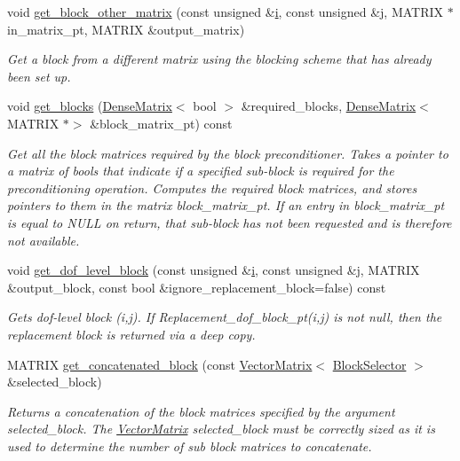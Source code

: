 \begin{DoxyCompactItemize}
void \hyperlink{classoomph_1_1BlockPreconditioner_a9dae351352d344321ea82999d7003e17}{get\+\_\+block\+\_\+other\+\_\+matrix} (const unsigned \&\hyperlink{cfortran_8h_adb50e893b86b3e55e751a42eab3cba82}{i}, const unsigned \&j, M\+A\+T\+R\+IX $\ast$in\+\_\+matrix\+\_\+pt, M\+A\+T\+R\+IX \&output\+\_\+matrix)
\begin{DoxyCompactList}\small\item\em Get a block from a different matrix using the blocking scheme that has already been set up. \end{DoxyCompactList}\item 
void \hyperlink{classoomph_1_1BlockPreconditioner_af836bb2d105d80fb4bc584c2d99c06ed}{get\+\_\+blocks} (\hyperlink{classoomph_1_1DenseMatrix}{Dense\+Matrix}$<$ bool $>$ \&required\+\_\+blocks, \hyperlink{classoomph_1_1DenseMatrix}{Dense\+Matrix}$<$ M\+A\+T\+R\+IX $\ast$$>$ \&block\+\_\+matrix\+\_\+pt) const
\begin{DoxyCompactList}\small\item\em Get all the block matrices required by the block preconditioner. Takes a pointer to a matrix of bools that indicate if a specified sub-\/block is required for the preconditioning operation. Computes the required block matrices, and stores pointers to them in the matrix block\+\_\+matrix\+\_\+pt. If an entry in block\+\_\+matrix\+\_\+pt is equal to N\+U\+LL on return, that sub-\/block has not been requested and is therefore not available. \end{DoxyCompactList}\item 
void \hyperlink{classoomph_1_1BlockPreconditioner_a314fc14d95f2833be66067cd5b45e093}{get\+\_\+dof\+\_\+level\+\_\+block} (const unsigned \&\hyperlink{cfortran_8h_adb50e893b86b3e55e751a42eab3cba82}{i}, const unsigned \&j, M\+A\+T\+R\+IX \&output\+\_\+block, const bool \&ignore\+\_\+replacement\+\_\+block=false) const
\begin{DoxyCompactList}\small\item\em Gets dof-\/level block (i,j). If Replacement\+\_\+dof\+\_\+block\+\_\+pt(i,j) is not null, then the replacement block is returned via a deep copy. \end{DoxyCompactList}\item 
M\+A\+T\+R\+IX \hyperlink{classoomph_1_1BlockPreconditioner_a51636746e5921ee2845daf60b1c322dc}{get\+\_\+concatenated\+\_\+block} (const \hyperlink{classoomph_1_1VectorMatrix}{Vector\+Matrix}$<$ \hyperlink{classoomph_1_1BlockSelector}{Block\+Selector} $>$ \&selected\+\_\+block)
\begin{DoxyCompactList}\small\item\em Returns a concatenation of the block matrices specified by the argument selected\+\_\+block. The \hyperlink{classoomph_1_1VectorMatrix}{Vector\+Matrix} selected\+\_\+block must be correctly sized as it is used to determine the number of sub block matrices to concatenate. \end{DoxyCompactList}\item 
$$
\end{DoxyCompactItemize}
